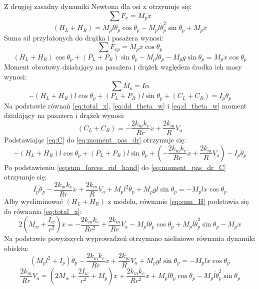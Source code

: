 Z drugiej zasadny dynamiki Newtona dla osi x otrzymuje się:
\begin{equation}
\sum F_x=M_p\ddot x
\end{equation}
\begin{equation}
(H_L+H_R)=M_pl\ddot \theta_p\cos \theta_p-M_pl\dot \theta_p^2\sin \theta_p+M_p\ddot x
\label{eq:sum_H}
\end{equation}
Suma sił przyłożonych do drążka i pasażera wynosi:
\begin{equation}
\sum F_{xp}=M_p\ddot x\cos \theta_p
\end{equation}
\begin{equation}
(H_L+H_R)\cos \theta_p+(P_L+P_R)\sin \theta_p-M_pl\ddot \theta_p-M_pg \sin \theta_p=M_p \ddot x \cos \theta_p
\label{eq:sum_forces_rid_hand}
\end{equation}
Moment obrotowy działający na pasażera i drążek względem środka ich masy wynosi:
\begin{equation}
\sum M_o=I\alpha
\end{equation}
\begin{equation}
-(H_L+H_R)l\cos \theta_p+(P_L+P_R)l\sin \theta_p+(C_L+C_R)=I_p\ddot \theta_p
\label{eq:moment_pas_dr}
\end{equation}
Na podstawie równań \eqref{eq:total_x}, \eqref{eq:dd_theta_w} i \eqref{eq:d_theta_w} moment działający na pasażera i drążek wynosi:
\begin{equation}
(C_L+C_R)=-\frac{2k_mk_e}{Rr}\dot x+\frac{2k_m}{R}V_a
\label{eq:sum_C}
\end{equation}
Podstawiając \eqref{eq:C} do \eqref{eq:moment_pas_dr} otrzymuje się:
\begin{equation}
-(H_L+H_R)l\cos \theta_p+(P_L+P_R)l\sin \theta_p+(-\frac{2k_mk_e}{Rr}\dot x+\frac{2k_m}{R}V_a)-I_p\ddot \theta_p
\label{eq:moment_pas_dr_C}
\end{equation}
Po podstawieniu \eqref{eq:sum_forces_rid_hand} do \eqref{eq:moment_pas_dr_C} otrzymuje się:
\begin{equation}
I_p\ddot \theta_p-\frac{2k_mk_e}{Rr}\dot x+\frac{2k_m}{R}V_a+M_pl^2\ddot \theta_p+M_pgl \sin \theta_p=-M_pl\ddot x\cos \theta_p
\end{equation}
Alby wyeliminować \((H_L+H_R)\) z modelu, równanie \eqref{eq:sum_H} podstawia się do równania \eqref{eq:total_x}:
\begin{equation}
2(M_w+\frac{I_w}{r^2})\ddot x=-\frac{2k_mk_e}{Rr^2}+\frac{2k_m}{Rr}V_a-M_pl\ddot \theta_p \cos \theta_p+M_pl\dot \theta_p^2\sin \theta_p-M_p\ddot x
\end{equation}
Na podstawie powyższych wyprowadzeń otrzymano nieliniowe równania dynamiki obiektu:
\begin{equation}
(M_pl^2+I_p)\ddot \theta_p-\frac{2k_mk_e}{Rr}\dot{x}+\frac{2k_m}{R}V_a+M_pgl\sin \theta_p=-M_pl\ddot x\cos \theta_p
\end{equation}
\begin{equation}
\frac{2k_m}{Rr}V_a=(2M_w+\frac{2I_w}{r^2}+M_p)\ddot x+\frac{2k_mk_e}{Rr^2}\dot x+M_pl\ddot \theta_p\cos \theta_p-M_pl\dot \theta_p^2\sin \theta_p
\end{equation}